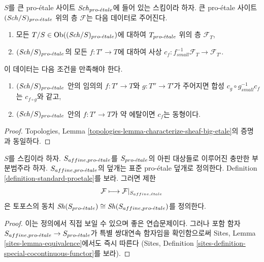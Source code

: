 \begin{lemma}
\label{lemma-characterize-sheaf-big}
$S$를 큰 pro-\'etale 사이트 $\mathit{Sch}_{pro\text{-}\acute{e}tale}$에 들어 있는 스킴이라 하자.
큰 pro-\'etale 사이트 $(\mathit{Sch}/S)_{pro\text{-}\acute{e}tale}$ 위의 층 $\mathcal{F}$는
다음 데이터로 주어진다.
\begin{enumerate}
\item 모든 $T/S \in \mathop{\mathrm{Ob}}\nolimits((\mathit{Sch}/S)_{pro\text{-}\acute{e}tale})$에 대하여
$T_{pro\text{-}\acute{e}tale}$ 위의 층 $\mathcal{F}_T$,
\item $(\mathit{Sch}/S)_{pro\text{-}\acute{e}tale}$의 모든 $f : T' \to T$에 대하여 사상
$c_f : f_{small}^{-1}\mathcal{F}_T \to \mathcal{F}_{T'}$.
\end{enumerate}
이 데이터는 다음 조건을 만족해야 한다.
\begin{enumerate}
\item[(a)] $(\mathit{Sch}/S)_{pro\text{-}\acute{e}tale}$ 안의 임의의 $f : T' \to T$와
$g : T'' \to T'$가 주어지면 합성
$c_g \circ g_{small}^{-1}c_f$는 $c_{f \circ g}$와 같고,
\item[(b)] $(\mathit{Sch}/S)_{pro\text{-}\acute{e}tale}$ 안의 $f : T' \to T$가 약 에탈이면
$c_f$는 동형이다.
\end{enumerate}
\end{lemma}

\begin{proof}
Topologies, Lemma \ref{topologies-lemma-characterize-sheaf-big-etale}의
증명과 동일하다.
\end{proof}

\begin{lemma}
\label{lemma-alternative}
$S$를 스킴이라 하자. $S_{affine, {pro\text{-}\acute{e}tale}}$를 $S_{pro\text{-}\acute{e}tale}$의 아핀
대상들로 이루어진 충만한 부분범주라 하자.
$S_{affine, {pro\text{-}\acute{e}tale}}$의 덮개는 표준 pro-\'etale 덮개로 정의한다.
Definition \ref{definition-standard-proetale}를 보라. 그러면 제한
$$
\mathcal{F} \longmapsto \mathcal{F}|_{S_{affine, {\acute{e}tale}}}
$$
은 토포스의 동치
$\mathop{\mathit{Sh}}\nolimits(S_{pro\text{-}\acute{e}tale}) \cong \mathop{\mathit{Sh}}\nolimits(S_{affine, {pro\text{-}\acute{e}tale}})$를 정의한다.
\end{lemma}

\begin{proof}
이는 정의에서 직접 보일 수 있으며 좋은 연습문제이다.
그러나 포함 함자 $S_{affine, {pro\text{-}\acute{e}tale}} \to S_{pro\text{-}\acute{e}tale}$가
특별 쌍대연속 함자임을 확인함으로써 Sites, Lemma
\ref{sites-lemma-equivalence}에서도 즉시 따른다
(Sites, Definition
\ref{sites-definition-special-cocontinuous-functor}를 보라).
\end{proof}

